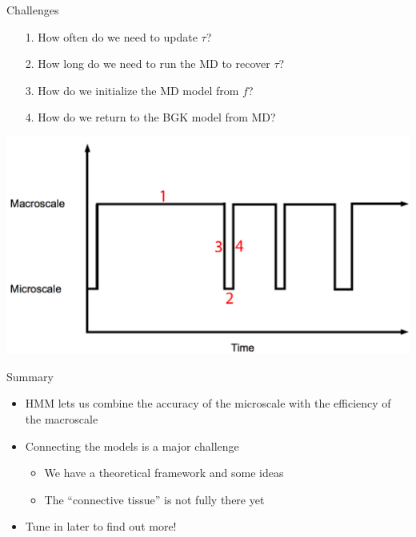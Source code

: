 \documentclass{beamer}
\begin{document}
	\begin{frame}{Challenges}
		\begin{itemize}
			\item[1. ]  How often do we need to update $\tau$?
			\item[2. ]  How long do we need to run the MD to recover $\tau$?
			\item[3. ]  How do we initialize the MD model from $f$?
			\item[4. ]  How do we return to the BGK model from MD?
		\end{itemize}
		\begin{center}
			\includegraphics[height=0.55\textheight]{scheme2.png}
		\end{center}
	\end{frame}
	
	\begin{frame}{Summary}
		\begin{itemize}
			\item HMM lets us combine the accuracy of the microscale with the efficiency of the macroscale
			\vspace{1em}
			\item Connecting the models is a major challenge
			\vspace{1em}
			\begin{itemize}
				\item We have a theoretical framework and some ideas
				\vspace{1em}
				\item The ``connective tissue'' is not fully there yet
			\vspace{1em}
			\end{itemize}
			\item Tune in later to find out more!
		\end{itemize}
	\end{frame}
	
	
\end{document}
